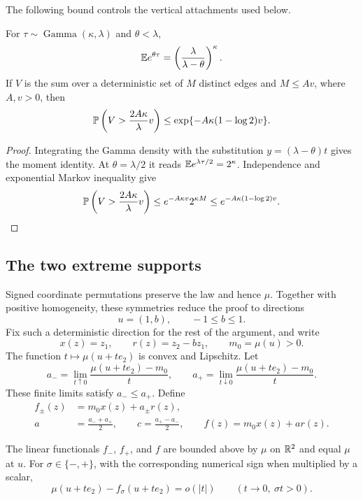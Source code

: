 The following bound controls the vertical attachments used below.

\begin{lemma}\label{df:ga:moment}
For $\tau\sim\operatorname{Gamma}(\kappa,\lambda)$ and $\theta<\lambda$,
\[
 \mathbb E e^{\theta\tau}
 =\left(\frac{\lambda}{\lambda-\theta}\right)^\kappa.
\]
If $V$ is the sum over a deterministic set of $M$ distinct edges and
$M\le A v$, where $A,v>0$, then
\begin{equation}\label{df:eq:gamma-sum-tail}
 \mathbb P\left(V>\frac{2A\kappa}{\lambda}v\right)
 \le \exp\{-A\kappa(1-\log 2)v\}.
\end{equation}
\end{lemma}

\begin{proof}
Integrating the Gamma density with the substitution
$y=(\lambda-\theta)t$ gives the moment identity. At
$\theta=\lambda/2$ it reads $\mathbb E e^{\lambda\tau/2}=2^\kappa$.
Independence and exponential Markov inequality give
\[
 \mathbb P\left(V>\frac{2A\kappa}{\lambda}v\right)
 \le e^{-A\kappa v}2^{\kappa M}
 \le e^{-A\kappa(1-\log 2)v}.
\]
\end{proof}

\subsection{The two extreme supports}

Signed coordinate permutations preserve the law and hence $\mu$.
Together with positive homogeneity, these symmetries reduce the proof
to directions
\[
 u=(1,b),\qquad -1\le b\le1.
\]
Fix such a deterministic direction for the rest of the argument, and
write
\[
 x(z)=z_1,\qquad r(z)=z_2-bz_1,
 \qquad m_0=\mu(u)>0.
\]
The function $t\mapsto\mu(u+te_2)$ is convex and Lipschitz. Let
\[
 a_- = \lim_{t\uparrow0}\frac{\mu(u+te_2)-m_0}{t},
 \qquad
 a_+ = \lim_{t\downarrow0}\frac{\mu(u+te_2)-m_0}{t}.
\]
These finite limits satisfy $a_-\le a_+$. Define
\begin{equation}\label{df:eq:support-definitions}
 \begin{split}
 f_\pm(z)&=m_0x(z)+a_\pm r(z),\\
 a&=\frac{a_-+a_+}{2},\qquad
 c=\frac{a_+-a_-}{2},\qquad
 f(z)=m_0x(z)+ar(z).
 \end{split}
\end{equation}

\begin{lemma}\label{df:prelim:supports}
The linear functionals $f_-$, $f_+$, and $f$ are bounded above by
$\mu$ on $\mathbb R^2$ and equal $\mu$ at $u$. For
$\sigma\in\{-,+\}$, with the corresponding numerical sign when
multiplied by a scalar,
\begin{equation}\label{df:eq:support-contact}
 \mu(u+te_2)-f_\sigma(u+te_2)=o(|t|)
 \qquad(t\to0,\ \sigma t>0).
\end{equation}
\end{lemma}

